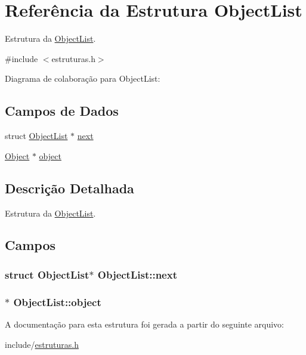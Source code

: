 \hypertarget{struct_object_list}{}\section{Referência da Estrutura Object\+List}
\label{struct_object_list}


Estrutura da \hyperlink{struct_object_list}{Object\+List}.  




{\ttfamily \#include $<$estruturas.\+h$>$}



Diagrama de colaboração para Object\+List\+:
\subsection*{Campos de Dados}
\begin{DoxyCompactItemize}
\item 
struct \hyperlink{struct_object_list}{Object\+List} $\ast$ \hyperlink{struct_object_list_a2e433d18d52a5cd2b3f90651157fdb23}{next}
\item 
\hyperlink{struct_object}{Object} $\ast$ \hyperlink{struct_object_list_aae49442726f57917e2d6611c62f1e071}{object}
\end{DoxyCompactItemize}


\subsection{Descrição Detalhada}
Estrutura da \hyperlink{struct_object_list}{Object\+List}. 

\subsection{Campos}
\subsubsection[{\texorpdfstring{next}{next}}]{\setlength{\rightskip}{0pt plus 5cm}struct {\bf Object\+List}$\ast$ Object\+List\+::next}\hypertarget{struct_object_list_a2e433d18d52a5cd2b3f90651157fdb23}{}\label{struct_object_list_a2e433d18d52a5cd2b3f90651157fdb23}
\subsubsection[{\texorpdfstring{object}{object}}]{$\ast$ Object\+List\+::object}\hypertarget{struct_object_list_aae49442726f57917e2d6611c62f1e071}{}\label{struct_object_list_aae49442726f57917e2d6611c62f1e071}


A documentação para esta estrutura foi gerada a partir do seguinte arquivo\+:\begin{DoxyCompactItemize}
\item 
include/\hyperlink{estruturas_8h}{estruturas.\+h}\end{DoxyCompactItemize}
